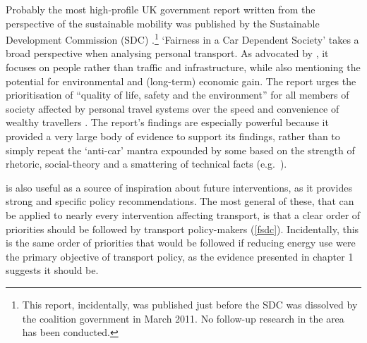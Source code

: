 Probably the most high-profile UK government report written from the perspective
of the sustainable mobility was published by the Sustainable Development
Commission (SDC) \citep{Kay2011}.\footnote{This report, incidentally, was
published just before the SDC was dissolved
by the coalition government in March 2011. No follow-up research
in the area has been conducted.
}
`Fairness in a Car
Dependent Society' takes
a broad perspective when analysing personal transport.
As advocated by \citet{Banister2008},
it focuses on people rather than traffic and infrastructure, while also mentioning
the potential for environmental and (long-term) economic gain.
The report urges the prioritisation of
``quality of life, safety and the environment'' for all members of society
affected by personal travel systems over the speed and convenience of
wealthy travellers \citep[p.~5]{Kay2011}. The report's findings are
especially powerful because it provided a very large body of evidence
to support its findings, rather than to simply repeat the `anti-car' mantra
expounded by some based on the strength of rhetoric, social-theory and
a smattering of technical facts (e.g.~\citealp{Dennis2009}).
% 

\citet{Kay2011} is also useful as a source of inspiration about
future interventions, as it provides %
strong and specific policy recommendations. The most general of these, that 
can be applied to nearly every intervention affecting transport, is that a clear order
of priorities should be followed by transport policy-makers (\cref{fsdc}).
Incidentally, this is the same order of priorities that would be
followed if reducing energy use were the primary objective of
transport policy, as the evidence presented in chapter 1 suggests it should be.

